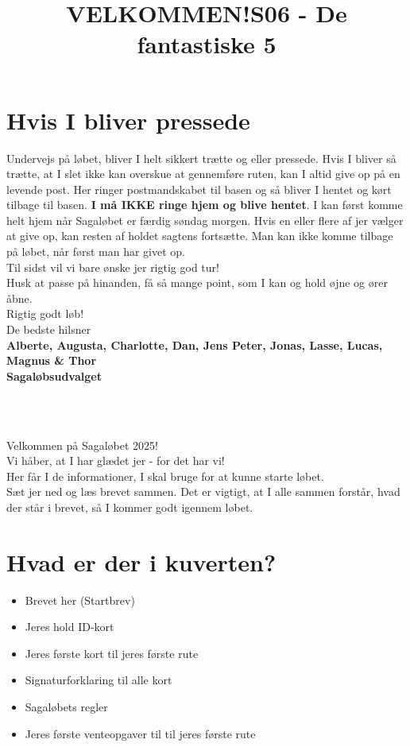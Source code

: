 \section{Hvis I bliver pressede}
Undervejs på løbet, bliver I helt sikkert trætte og eller pressede. Hvis I bliver så trætte, at I slet ikke kan overskue at gennemføre ruten, kan I altid give op på en levende post. Her ringer postmandskabet til basen og så bliver I hentet og kørt tilbage til basen. \textbf{I må IKKE ringe hjem og blive hentet}. I kan først komme helt hjem når Sagaløbet er færdig søndag morgen. Hvis en eller flere af jer vælger at give op, kan resten af holdet sagtens fortsætte. Man kan ikke komme tilbage på løbet, når først man har givet op.\\
\newline
Til sidst vil vi bare ønske jer rigtig god tur!\\
Husk at passe på hinanden, få så mange point, som I kan og hold øjne og ører åbne.\\
\newline
Rigtig godt løb!\\
\newline
\textcolor{søblå}{De bedste hilsner}\\
\textcolor{natblå}{\textbf{Alberte, Augusta, Charlotte, Dan, Jens Peter, Jonas, Lasse, Lucas, Magnus \& Thor}}\\
\textcolor{natblå}{\textbf{Sagaløbsudvalget}}\\
\newpage
\title{VELKOMMEN!}\\
\newline
\title{\textcolor{flammefarvet}{S06 - De fantastiske 5 }}\\
\newline
Velkommen på Sagaløbet 2025!\\
Vi håber, at I har glædet jer - for det har vi!\\
Her får I de informationer, I skal bruge for at kunne starte løbet.\\
Sæt jer ned og læs brevet sammen. Det er vigtigt, at I alle sammen forstår, hvad der står i brevet, så I kommer godt igennem løbet.
\section{Hvad er der i kuverten?}
\begin{itemize}
    \item Brevet her (Startbrev)
    \item Jeres hold ID-kort
    \item Jeres første kort til jeres første rute
    \item Signaturforklaring til alle kort
    \item Sagaløbets regler
    \item Jeres første venteopgaver til til jeres første rute
\end{itemize}
